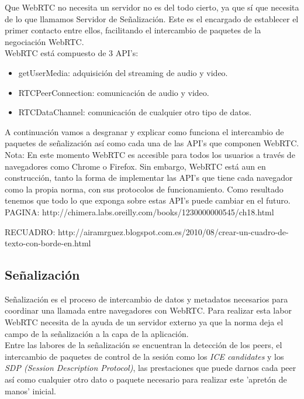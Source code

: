 Que WebRTC no necesita un servidor no es del todo cierto, ya que sí que necesita de lo que llamamos Servidor de Señalización. Este es el encargado de establecer el primer contacto entre ellos, facilitando el intercambio de paquetes de la negociación WebRTC.\\

WebRTC está compuesto de 3 API's:

\begin{itemize}
\item getUserMedia: adquisición del streaming de audio y video.
\item RTCPeerConnection: comunicación de audio y video.
\item RTCDataChannel: comunicación de cualquier otro tipo de datos.
\end{itemize}

A continuación vamos a desgranar y explicar como funciona el intercambio de paquetes de señalización así como cada una de las API's que componen WebRTC.\\

Nota: En este momento WebRTC es accesible para todos los usuarios a través de navegadores como Chrome o Firefox. Sin embargo, WebRTC está aun en construcción, tanto la forma de implementar las API's que tiene cada navegador como la propia norma, con sus protocolos de funcionamiento. Como resultado tenemos que todo lo que exponga sobre estas API's puede cambiar en el futuro.\\

PAGINA: http://chimera.labs.oreilly.com/books/1230000000545/ch18.html

RECUADRO: http://airamrguez.blogspot.com.es/2010/08/crear-un-cuadro-de-texto-con-borde-en.html

\subsection{Señalización} 

Señalización es el proceso de intercambio de datos y metadatos necesarios para coordinar una llamada entre navegadores con WebRTC. Para realizar esta labor WebRTC necesita de la ayuda de un servidor externo ya que la norma deja el campo de la señalización a la capa de la aplicación.\\

Entre las labores de la señalización se encuentran la detección de los peers, el intercambio de paquetes de control de la sesión como los \textit{ICE candidates} y los \textit{SDP (Session Description Protocol)}, las prestaciones que puede darnos cada peer así como cualquier otro dato o paquete necesario para realizar este 'apretón de manos' inicial.\\

